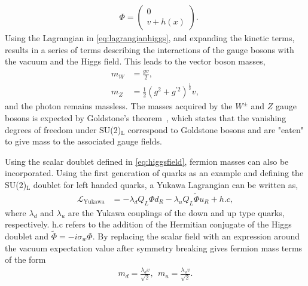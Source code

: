 \begin{equation}\renewcommand*{\arraystretch}{\newarraystrech}
    \label{eq:higgsfield}
    \begin{aligned}
        & \Phi = 
        \begin{pmatrix}
            0\\
            v + h(x)
        \end{pmatrix}.
     \end{aligned}
\end{equation}
Using the Lagrangian in \cref{eq:lagrangianhiggs}, and expanding the kinetic terms, results in a series of terms describing the interactions of the gauge bosons with the vacuum and the Higgs field. This leads to the vector boson masses, 
\begin{equation}
    \label{eq:bosonmasses}
    \begin{aligned}
        m_W &= \frac{gv}{2},\\
        m_Z &= \frac{1}{2}(g^2 + g^{\prime 2})^{\frac{1}{2}}v,
     \end{aligned}
\end{equation}
and the photon remains massless. The masses acquired by the $W^\pm$ and $Z$ gauge bosons is expected by Goldstone's theorem~\cite{PhysRev.127.965}, which states that the vanishing degrees of freedom under SU(2)$_\mathrm{L}$ correspond to Goldstone bosons and are "eaten" to give mass to the associated gauge fields. 

Using the scalar doublet defined in \cref{eq:higgsfield}, fermion masses can also be incorporated. Using the first generation of quarks as an example and defining the SU(2)$_\mathrm{L}$ doublet for left handed quarks, a Yukawa Lagrangian can be written as, 
\begin{equation}
    \label{eq:YukawaLagrangian}
    \begin{aligned}
        \mathcal{L}_\mathrm{Yukawa} &= -\lambda_d Q_L \Phi d_R - \lambda_u Q_L \tilde{\Phi}u_R + h.c,
     \end{aligned}
\end{equation}
where $\lambda_{d}$ and $\lambda_u$ are the Yukawa couplings of the down and up type quarks, respectively. h.c refers to the addition of the Hermitian conjugate of the Higgs doublet and $\tilde{\Phi} = -i\sigma_w\Phi$. By replacing the scalar field with an expression around the vacuum expectation value after symmetry breaking gives fermion mass terms of the form
\begin{equation}
    \label{eq:fermionmass}
    \begin{aligned}
        m_d = \frac{\lambda_d v}{\sqrt{2}},~~m_u = \frac{\lambda_u v}{\sqrt{2}}.
     \end{aligned}
\end{equation}

